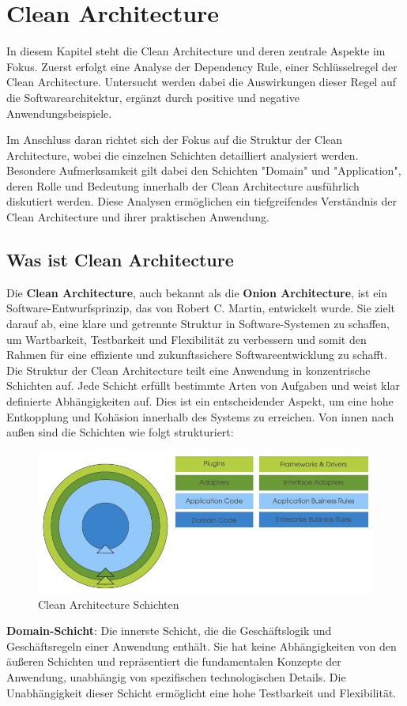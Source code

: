 \chapter{Clean Architecture}
In diesem Kapitel steht die Clean Architecture und deren zentrale Aspekte im Fokus. Zuerst erfolgt eine Analyse der Dependency Rule, einer Schlüsselregel der Clean Architecture. Untersucht werden dabei die Auswirkungen dieser Regel auf die Softwarearchitektur, ergänzt durch positive und negative Anwendungsbeispiele.

Im Anschluss daran richtet sich der Fokus auf die Struktur der Clean Architecture, wobei die einzelnen Schichten detailliert analysiert werden. Besondere Aufmerksamkeit gilt dabei den Schichten "Domain" und "Application", deren Rolle und Bedeutung innerhalb der Clean Architecture ausführlich diskutiert werden. Diese Analysen ermöglichen ein tiefgreifendes Verständnis der Clean Architecture und ihrer praktischen Anwendung.
\section{Was ist Clean Architecture}
Die \textbf{Clean Architecture}, auch bekannt als die \textbf{Onion Architecture}, ist ein Software-Entwurfsprinzip, das von Robert C. Martin, entwickelt wurde. Sie zielt darauf ab, eine klare und getrennte Struktur in Software-Systemen zu schaffen, um Wartbarkeit, Testbarkeit und Flexibilität zu verbessern und somit den Rahmen für eine effiziente und zukunftssichere Softwareentwicklung zu schafft.\\

Die Struktur der Clean Architecture teilt eine Anwendung in konzentrische Schichten auf. Jede Schicht erfüllt bestimmte Arten von Aufgaben und weist klar definierte Abhängigkeiten auf. Dies ist ein entscheidender Aspekt, um eine hohe Entkopplung und Kohäsion innerhalb des Systems zu erreichen. Von innen nach außen sind die Schichten wie folgt strukturiert:

\begin{figure}[ht]
    \includegraphics[width=1\textwidth]{Bilder/clean-architecture.jpeg}
    \caption{Clean Architecture Schichten\cite{briem}}
    \label{fig:clean-architecture}
\end{figure}
\newpage
\textbf{Domain-Schicht}: Die innerste Schicht, die die Geschäftslogik und Geschäftsregeln einer Anwendung enthält. Sie hat keine Abhängigkeiten von den äußeren Schichten und repräsentiert die fundamentalen Konzepte der Anwendung, unabhängig von spezifischen technologischen Details. Die Unabhängigkeit dieser Schicht ermöglicht eine hohe Testbarkeit und Flexibilität.

